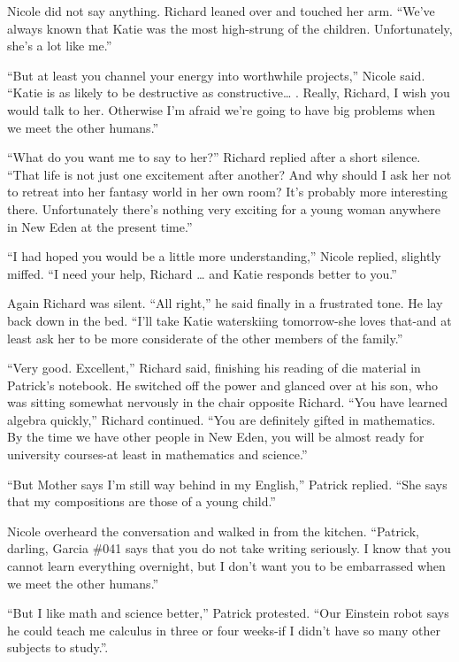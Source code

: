\documentclass[]{article}
\begin{document}
{Nicole did not say anything.  Richard leaned over and touched her arm.  “We’ve always known that Katie was the most high-strung of the children.  Unfortunately, she’s a lot like me.”

“But at least you channel your energy into worthwhile projects,” Nicole said.  “Katie is as likely to be destructive as constructive… .  Really, Richard, I wish you would talk to her.  Otherwise I’m afraid we’re going to have big problems when we meet the other humans.”

“What do you want me to say to her?” Richard replied after a short silence.  “That life is not just one excitement after another? And why should I ask her not to retreat into her fantasy world in her own room? It’s probably more interesting there.  Unfortunately there’s nothing very exciting for a young woman anywhere in New Eden at the present time.”

“I had hoped you would be a little more understanding,” Nicole replied, slightly miffed.  “I need your help, Richard … and Katie responds better to you.”

Again Richard was silent.  “All right,” he said finally in a frustrated tone.  He lay back down in the bed.  “I’ll take Katie waterskiing tomorrow-she loves that-and at least ask her to be more considerate of the other members of the family.”

“Very good.  Excellent,” Richard said, finishing his reading of die material in Patrick’s notebook.  He switched off the power and glanced over at his son, who was sitting somewhat nervously in the chair opposite Richard.  “You have learned algebra quickly,” Richard continued.  “You are definitely gifted in mathematics.  By the time we have other people in New Eden, you will be almost ready for university courses-at least in mathematics and science.”

“But Mother says I’m still way behind in my English,” Patrick replied.  “She says that my compositions are those of a young child.”

Nicole overheard the conversation and walked in from the kitchen.  “Patrick, darling, Garcia \#041 says that you do not take writing seriously.  I know that you cannot learn everything overnight, but I don’t want you to be embarrassed when we meet the other humans.”

“But I like math and science better,” Patrick protested.  “Our Einstein robot says he could teach me calculus in three or four weeks-if I didn’t have so many other subjects to study.”.

}
\end{document}

